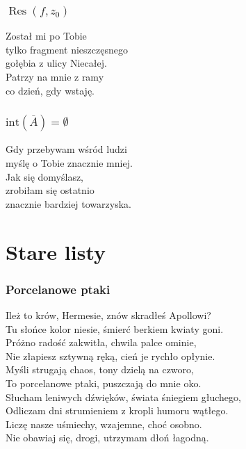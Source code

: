 \documentclass[12pt, a4paper]{memoir}
\renewenvironment{verse}{%
  \par\vspace{\baselineskip}\raggedright
}{
  \par\vspace{\baselineskip}
}
\begin{document}
\newpage
\section[Residuum]{$\operatorname{Res}(f, z_0)$}
\begin{verse}
Został mi po Tobie\\
tylko fragment nieszczęsnego\\
gołębia z ulicy Niecałej.\\[\baselineskip]

Patrzy na mnie z ramy\\
co dzień, gdy wstaję.
\end{verse}


\newpage
\section[Zbiory nigdziegęste]{$\text{int}(\overline{A}) = \emptyset$}

\begin{verse}
Gdy przebywam wśród ludzi\\
myślę o Tobie znacznie mniej.\\[\baselineskip]

Jak się domyślasz,\\
zrobiłam się ostatnio \\
znacznie bardziej towarzyska.
\end{verse}

\part{Stare listy}
\newpage
\section{Porcelanowe ptaki}
\begin{verse}
Ileż to krów, Hermesie, znów skradłeś Apollowi?\\
Tu słońce kolor niesie, śmierć berkiem kwiaty goni.\\
Próżno radość zakwitła, chwila palce ominie,\\
Nie złapiesz sztywną ręką, cień je rychło opłynie.\\[\baselineskip]

Myśli strugają chaos, tony dzielą na czworo,\\
To porcelanowe ptaki, puszczają do mnie oko.\\
Słucham leniwych dźwięków, świata śniegiem głuchego,\\
Odliczam dni strumieniem z kropli humoru wątłego.\\[\baselineskip]

Liczę nasze uśmiechy, wzajemne, choć osobno.\\
Nie obawiaj się, drogi, utrzymam dłoń łagodną.
\end{verse}
\end{document}

